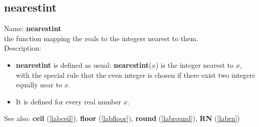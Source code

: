 \subsection{nearestint}
\label{labnearestint}
\noindent Name: \textbf{nearestint}\\
the function mapping the reals to the integers nearest to them.\\
\noindent Description: \begin{itemize}

\item \textbf{nearestint} is defined as usual: \textbf{nearestint}($x$) is the integer nearest to $x$, with the
   special rule that the even integer is chosen if there exist two integers equally near to $x$.

\item It is defined for every real number $x$.
\end{itemize}
See also: \textbf{ceil} (\ref{labceil}), \textbf{floor} (\ref{labfloor}), \textbf{round} (\ref{labround}), \textbf{RN} (\ref{labrn})
